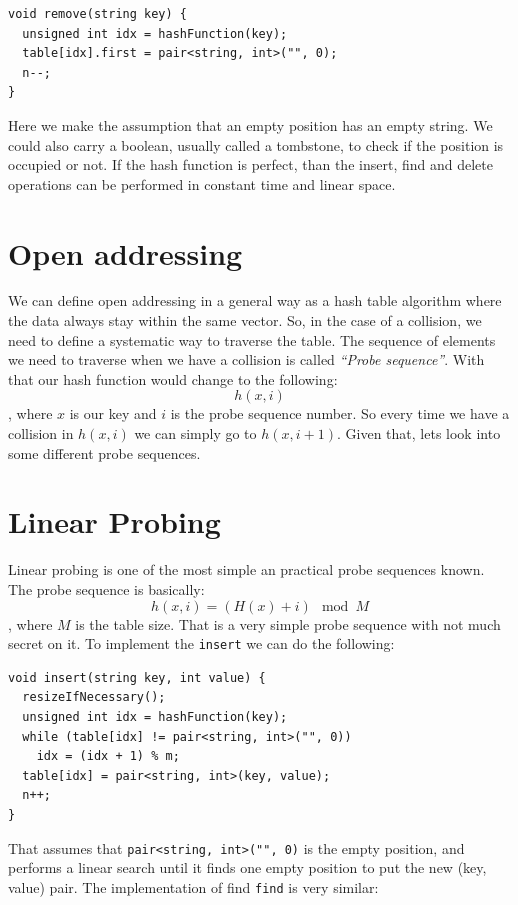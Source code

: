 \begin{lstlisting}
void remove(string key) {
  unsigned int idx = hashFunction(key);
  table[idx].first = pair<string, int>("", 0);
  n--;
}
\end{lstlisting}

Here we make the assumption that an empty position has an empty string. We could also carry a boolean, usually called a tombstone, to check if the position is occupied or not. If the hash function is perfect, than the insert, find and delete operations can be performed in constant time and linear space.

\section{Open addressing}

We can define open addressing in a general way as a hash table algorithm where the data always stay within the same vector. So, in the case of a collision, we need to define a systematic way to traverse the table. The sequence of elements we need to traverse when we have a collision is called \textit{``Probe sequence''}. With that our hash function would change to the following:
\[ h(x, i) \],
where \( x \) is our key and \( i \) is the probe sequence number. So every time we have a collision in \( h(x, i) \) we can simply go to \( h(x, i + 1) \). Given that, lets look into some different probe sequences.

\section{Linear Probing}

Linear probing is one of the most simple an practical probe sequences known. The probe sequence is basically:
\[ h(x, i) = (H(x) + i) \mod M \],
where \( M \) is the table size. That is a very simple probe sequence with not much secret on it. To implement the \texttt{insert} we can do the following:

\begin{lstlisting}
void insert(string key, int value) {
  resizeIfNecessary();
  unsigned int idx = hashFunction(key);
  while (table[idx] != pair<string, int>("", 0))
    idx = (idx + 1) % m;      
  table[idx] = pair<string, int>(key, value);
  n++;
}
\end{lstlisting}

That assumes that \texttt{pair<string, int>("", 0)} is the empty position, and performs a linear search until it finds one empty position to put the new (key, value) pair. The implementation of find \texttt{find} is very similar:

